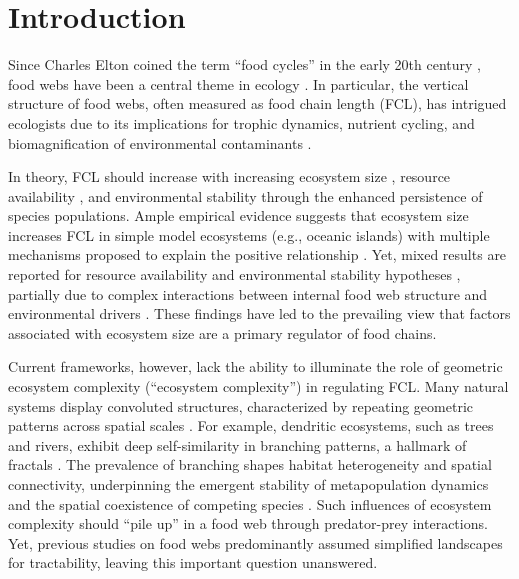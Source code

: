 \documentclass[11pt, class=article, crop=false]{standalone}
\begin{document}
\newpage

\section{Introduction}
Since Charles Elton coined the term ``food cycles'' in the early 20th century \citep{elton_animal_1927}, food webs have been a central theme in ecology \citep{paine_food_1966, pimm_food_1991, post_long_2002}.
In particular, the vertical structure of food webs, often measured as food chain length (FCL), has intrigued ecologists due to its implications for trophic dynamics, nutrient cycling, and biomagnification of environmental contaminants \citep{post_long_2002}.

In theory, FCL should increase with increasing ecosystem size \citep{schoener_food_1989}, resource availability \citep{oksanen_exploitation_1981}, and environmental stability \citep{pimm_number_1977} through the enhanced persistence of species populations.
Ample empirical evidence suggests that ecosystem size increases FCL in simple model ecosystems (e.g., oceanic islands) \citep{vander_zanden_patterns_1999, post_ecosystem_2000, takimoto_ecosystem_2008, doi_resource_2009} with multiple mechanisms proposed to explain the positive relationship \citep{takimoto_effects_2012, ward_mechanistic_2017, mcintosh_capacity_2018, terui_spatial_2019}.
Yet, mixed results are reported for resource availability and environmental stability hypotheses \citep{takimoto_environmental_2013, warfe_productivity_2013, guo_towards_2023}, partially due to complex interactions between internal food web structure and environmental drivers \citep{takimoto_effects_2012, shibasaki_food_2024}.
These findings have led to the prevailing view that factors associated with ecosystem size are a primary regulator of food chains.

Current frameworks, however, lack the ability to illuminate the role of geometric ecosystem complexity (``ecosystem complexity'') in regulating FCL.
Many natural systems display convoluted structures, characterized by repeating geometric patterns across spatial scales \citep{rodriguez-iturbe_fractal_2001, turner_landscape_2015}.
For example, dendritic ecosystems, such as trees and rivers, exhibit deep self-similarity in branching patterns, a hallmark of fractals \citep{rodriguez-iturbe_fractal_2001, terui_revisiting_2024}.
The prevalence of branching shapes habitat heterogeneity and spatial connectivity, underpinning the emergent stability of metapopulation dynamics \citep{yeakel_synchronisation_2014, moore_emergent_2015, terui_metapopulation_2018} and the spatial coexistence of competing species  \citep{terui_emergent_2021}.
Such influences of ecosystem complexity should ``pile up'' in a food web through predator-prey interactions.
Yet, previous studies on food webs predominantly assumed simplified landscapes for tractability, leaving this important question unanswered.
\end{document}
